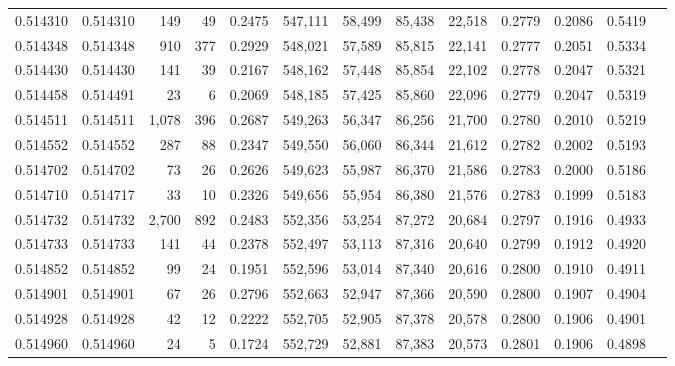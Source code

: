 \begin{tabular}{rrrrrrrrrrrrr}
0.514310 & 0.514310 &   149 &    49 &                                     0.2475 & 547,111 &  58,499 &  85,438 &  22,518 & 0.2779 & 0.2086 & 0.5419 \\
0.514348 & 0.514348 &   910 &   377 &                                     0.2929 & 548,021 &  57,589 &  85,815 &  22,141 & 0.2777 & 0.2051 & 0.5334 \\
0.514430 & 0.514430 &   141 &    39 &                                     0.2167 & 548,162 &  57,448 &  85,854 &  22,102 & 0.2778 & 0.2047 & 0.5321 \\
0.514458 & 0.514491 &    23 &     6 &                                     0.2069 & 548,185 &  57,425 &  85,860 &  22,096 & 0.2779 & 0.2047 & 0.5319 \\
0.514511 & 0.514511 & 1,078 &   396 &                                     0.2687 & 549,263 &  56,347 &  86,256 &  21,700 & 0.2780 & 0.2010 & 0.5219 \\
0.514552 & 0.514552 &   287 &    88 &                                     0.2347 & 549,550 &  56,060 &  86,344 &  21,612 & 0.2782 & 0.2002 & 0.5193 \\
0.514702 & 0.514702 &    73 &    26 &                                     0.2626 & 549,623 &  55,987 &  86,370 &  21,586 & 0.2783 & 0.2000 & 0.5186 \\
0.514710 & 0.514717 &    33 &    10 &                                     0.2326 & 549,656 &  55,954 &  86,380 &  21,576 & 0.2783 & 0.1999 & 0.5183 \\
0.514732 & 0.514732 & 2,700 &   892 &                                     0.2483 & 552,356 &  53,254 &  87,272 &  20,684 & 0.2797 & 0.1916 & 0.4933 \\
0.514733 & 0.514733 &   141 &    44 &                                     0.2378 & 552,497 &  53,113 &  87,316 &  20,640 & 0.2799 & 0.1912 & 0.4920 \\
0.514852 & 0.514852 &    99 &    24 &                                     0.1951 & 552,596 &  53,014 &  87,340 &  20,616 & 0.2800 & 0.1910 & 0.4911 \\
0.514901 & 0.514901 &    67 &    26 &                                     0.2796 & 552,663 &  52,947 &  87,366 &  20,590 & 0.2800 & 0.1907 & 0.4904 \\
0.514928 & 0.514928 &    42 &    12 &                                     0.2222 & 552,705 &  52,905 &  87,378 &  20,578 & 0.2800 & 0.1906 & 0.4901 \\
0.514960 & 0.514960 &    24 &     5 &                                     0.1724 & 552,729 &  52,881 &  87,383 &  20,573 & 0.2801 & 0.1906 & 0.4898 \\

\end{tabular}
